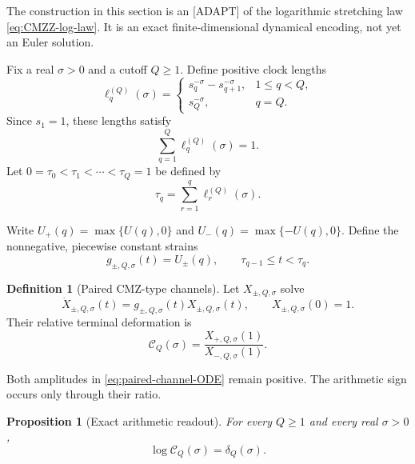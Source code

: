 \documentclass[11pt]{amsart}
\numberwithin{equation}{section}
\theoremstyle{plain}
\newtheorem{proposition}[theorem]{Proposition}
\theoremstyle{definition}
\newtheorem{definition}[theorem]{Definition}
\theoremstyle{remark}
\begin{document}
The construction in this section is an \textup{[ADAPT]} of the logarithmic
stretching law \eqref{eq:CMZZ-log-law}.  It is an exact finite-dimensional
dynamical encoding, not yet an Euler solution.

Fix a real $\sigma>0$ and a cutoff $Q\ge1$.  Define positive clock lengths
\begin{equation}
\ell_q^{(Q)}(\sigma)=
\begin{cases}
s_q^{-\sigma}-s_{q+1}^{-\sigma},&1\le q<Q,\\
s_Q^{-\sigma},&q=Q.
\end{cases}
\label{eq:CMZ-clock-lengths}
\end{equation}
Since $s_1=1$, these lengths satisfy
\begin{equation}
\sum_{q=1}^{Q}\ell_q^{(Q)}(\sigma)=1.
\label{eq:CMZ-clock-total}
\end{equation}
Let $0=\tau_0<\tau_1<\cdots<\tau_Q=1$ be defined by
\begin{equation}
\tau_q=\sum_{r=1}^{q}\ell_r^{(Q)}(\sigma).
\label{eq:CMZ-clock-partition}
\end{equation}

Write $U_+(q)=\max\{U(q),0\}$ and
$U_-(q)=\max\{-U(q),0\}$.  Define the nonnegative, piecewise constant
strains
\begin{equation}
g_{\pm,Q,\sigma}(t)=U_\pm(q),
\qquad \tau_{q-1}\le t<\tau_q.
\label{eq:positive-strains}
\end{equation}

\begin{definition}[Paired CMZ-type channels]
\label{def:paired-channels}
Let $X_{\pm,Q,\sigma}$ solve
\begin{equation}
\dot X_{\pm,Q,\sigma}(t)
=g_{\pm,Q,\sigma}(t)X_{\pm,Q,\sigma}(t),
\qquad X_{\pm,Q,\sigma}(0)=1.
\label{eq:paired-channel-ODE}
\end{equation}
Their relative terminal deformation is
\begin{equation}
\mathscr C_Q(\sigma)=
\frac{X_{+,Q,\sigma}(1)}{X_{-,Q,\sigma}(1)}.
\label{eq:relative-deformation}
\end{equation}
\end{definition}

Both amplitudes in \eqref{eq:paired-channel-ODE} remain positive.  The
arithmetic sign occurs only through their ratio.

\begin{proposition}[Exact arithmetic readout]
\label{prop:exact-CMZ-readout}
For every $Q\ge1$ and every real $\sigma>0$,
\begin{equation}
\log\mathscr C_Q(\sigma)=\delta_Q(\sigma).
\label{eq:CMZ-readout}
\end{equation}
\end{proposition}
\end{document}
